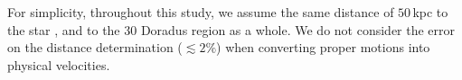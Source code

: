 \documentclass[a4paper,fleqn,usenatbib]{mnras}
\newcommand{\todo}[1]{{\large $\blacksquare$~\textbf{\color{red}[#1]}}~$\blacksquare$}
\newcommand{\kms}{{\,\mathrm{km\ s^{-1}}}}
\begin{document}

For simplicity, throughout this study, we assume the same
distance of $50$\,kpc to the star \citep[][]{pietrzynski:13}, and to
the 30 Doradus region as a whole. We do not consider the error on
the distance determination ($\lesssim2\%$) when converting proper motions into
physical velocities. %
\end{document}
